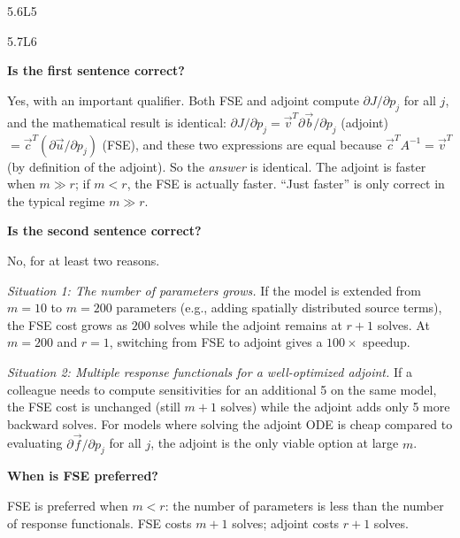 \begin{solution}{5.6}{L5}

\end{solution}

\begin{solution}{5.7}{L6}

\solanswer

 \textbf{Is the first sentence correct?}

Yes, with an important qualifier. Both FSE and adjoint compute
$\partial J/\partial p_j$ for all $j$, and the mathematical result
is identical: $\partial J/\partial p_j = \vec{v}^T\partial\vec{b}/\partial p_j$
(adjoint) $= \vec{c}^T(\partial\vec{u}/\partial p_j)$ (FSE), and
these two expressions are equal because $\vec{c}^T A^{-1} = \vec{v}^T$
(by definition of the adjoint). So the \emph{answer} is identical.
The adjoint is faster when $m \gg r$; if $m < r$, the FSE is actually
faster. ``Just faster'' is only correct in the typical regime $m \gg r$.

 \textbf{Is the second sentence correct?}

No, for at least two reasons.

\textit{Situation 1: The number of parameters grows.} If the model
is extended from $m = 10$ to $m = 200$ parameters (e.g., adding
spatially distributed source terms), the FSE cost grows as $200$
solves while the adjoint remains at $r + 1$ solves. At $m = 200$
and $r = 1$, switching from FSE to adjoint gives a $100\times$ speedup.

\textit{Situation 2: Multiple response functionals for a well-optimized
adjoint.} If a colleague needs to compute sensitivities for an
additional 5 \QOIs on the same model, the FSE cost is unchanged
(still $m + 1$ solves) while the adjoint adds only 5 more backward
solves. For models where solving the adjoint ODE is cheap compared
to evaluating $\partial\vec{f}/\partial p_j$ for all $j$, the adjoint
is the only viable option at large $m$.

 \textbf{When is FSE preferred?}

FSE is preferred when $m < r$: the number of parameters is less than
the number of response functionals. FSE costs $m + 1$ solves;
adjoint costs $r + 1$ solves.


\end{solution}
